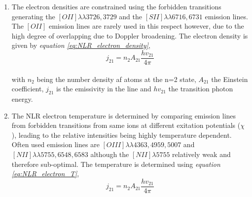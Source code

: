\documentclass[11pt]{article}
\begin{document}
\begin{enumerate}
\item The electron densities are constrained using the forbidden transitions generating the $[OII] \lambda\lambda 3726,3729$ and the $[SII] \lambda\lambda 6716,6731$ emission lines. The $[OII]$ emission lines are rarely used in this respect however, due to the high degree of overlapping due to Doppler broadening. The electron density is given by \emph{equation \ref{eq:NLR_electron_density}},
\begin{equation}
j_{21} = n_{2}A_{21}\frac{hv_{21}} {4\pi}
\label{eq:NLR_electron_density}
\end{equation}\\
with $n_{2}$ being the number density af atoms at the n=2 state, $A_{21}$ the Einstein coefficient, $j_{21}$ is the emissivity in the line and $hv_{21}$ the transition photon energy.
\item The NLR electron temperature is determined by comparing emission lines from forbidden transitions from same ions at different exitation potentials ($\chi$), leading to the relative intensities being highly temperature dependent. Often used emission lines are $[OIII]\lambda\lambda 4363,4959,5007$ and $[NII] \lambda\lambda 5755,6548,6583$ although the $[NII] \lambda 5755$ relatively weak and therefore sub-optimal. The temperature is determined using \emph{equation \ref{eq:NLR_electron_T}},
\begin{equation}
j_{21} = n_{2}A_{21}\frac{hv_{21}} {4\pi}
\label{eq:NLR_electron_T}
\end{equation}\\
\end{enumerate}
\end{document}
